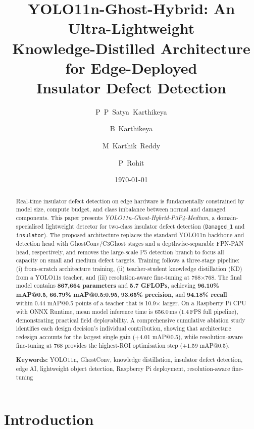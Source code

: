 \documentclass[11pt,a4paper]{article}
\title{%
  \LARGE\textbf{YOLO11n-Ghost-Hybrid: An Ultra-Lightweight \\
  Knowledge-Distilled Architecture for Edge-Deployed \\
  Insulator Defect Detection}%
}
\author{%
  P~P~Satya~Karthikeya \and
  B~Karthikeya \and
  M~Karthik~Reddy \and
  P~Rohit%
}
\date{\today}
\begin{document}
\maketitle
\thispagestyle{empty}

\begin{abstract}
\noindent
Real-time insulator defect detection on edge hardware is fundamentally constrained by model
size, compute budget, and class imbalance between normal and damaged components. This paper
presents \textit{YOLO11n-Ghost-Hybrid-P3P4-Medium}, a domain-specialised lightweight
detector for two-class insulator defect detection (\texttt{Damaged\_1} and
\texttt{insulator}). The proposed architecture replaces the standard YOLO11n backbone and
detection head with GhostConv/C3Ghost stages and a depthwise-separable FPN-PAN head,
respectively, and removes the large-scale P5 detection branch to focus all capacity on
small and medium defect targets. Training follows a three-stage pipeline: (i) from-scratch
architecture training, (ii) teacher-student knowledge distillation (KD) from a YOLO11s
teacher, and (iii) resolution-aware fine-tuning at 768$\times$768. The final model
contains \textbf{867,664 parameters} and \textbf{5.7 GFLOPs}, achieving \textbf{96.10\%
mAP@0.5}, \textbf{66.79\% mAP@0.5:0.95}, \textbf{93.65\% precision}, and \textbf{94.18\%
recall}---within 0.44 mAP@0.5 points of a teacher that is 10.9$\times$ larger. On a
Raspberry Pi CPU with ONNX Runtime, mean model inference time is 656.0\,ms (1.4\,FPS full
pipeline), demonstrating practical field deployability. A comprehensive cumulative ablation
study identifies each design decision's individual contribution, showing that architecture
redesign accounts for the largest single gain (+4.01 mAP@0.5), while resolution-aware
fine-tuning at 768 provides the highest-ROI optimisation step (+1.59 mAP@0.5).

\vspace{0.5em}
\noindent\textbf{Keywords:} YOLO11n, GhostConv, knowledge distillation, insulator defect
detection, edge AI, lightweight object detection, Raspberry Pi deployment,
resolution-aware fine-tuning
\end{abstract}

\newpage
\tableofcontents
\newpage

\section{Introduction}
\label{sec:intro}
\end{document}
